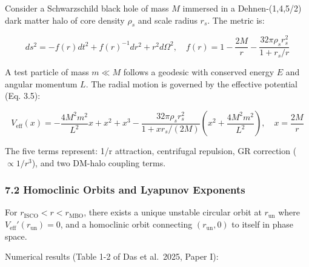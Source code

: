 \documentclass[
]{article}
\begin{document}
Consider a Schwarzschild black hole of mass \(M\) immersed in a
Dehnen-(1,4,5/2) dark matter halo of core density \(\rho_s\) and scale
radius \(r_s\). The metric is:

\[ds^2 = -f(r)dt^2 + f(r)^{-1}dr^2 + r^2 d\Omega^2, \quad f(r) = 1 - \frac{2M}{r} - \frac{32\pi\rho_s r_s^2}{1 + r_s/r}\]

A test particle of mass \(m \ll M\) follows a geodesic with conserved
energy \(E\) and angular momentum \(L\). The radial motion is governed
by the effective potential (Eq. 3.5):

\[V_{\text{eff}}(x) = -\frac{4M^2 m^2}{L^2}x + x^2 + x^3 - \frac{32\pi\rho_s r_s^2}{1 + x r_s/(2M)}\left(x^2 + \frac{4M^2 m^2}{L^2}\right), \quad x = \frac{2M}{r}\]

The five terms represent: 1/r attraction, centrifugal repulsion, GR
correction (\(\propto 1/r^3\)), and two DM-halo coupling terms.

\subsubsection{7.2 Homoclinic Orbits and Lyapunov
Exponents}\label{homoclinic-orbits-and-lyapunov-exponents}

For \(r_{\text{ISCO}} < r < r_{\text{MBO}}\), there exists a unique
unstable circular orbit at \(r_{\text{un}}\) where
\(V_{\text{eff}}'(r_{\text{un}}) = 0\), and a homoclinic orbit
connecting \((r_{\text{un}}, 0)\) to itself in phase space.

Numerical results (Table 1-2 of Das et al.~2025, Paper I):
\end{document}
